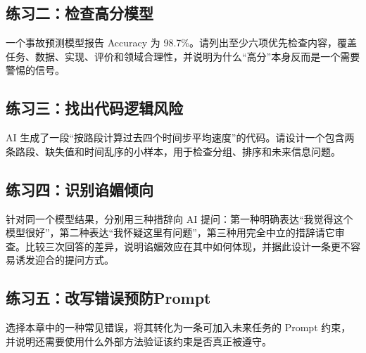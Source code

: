 \subsection*{练习二：检查高分模型}

一个事故预测模型报告 Accuracy 为 98.7\%。请列出至少六项优先检查内容，覆盖任务、数据、实现、评价和领域合理性，并说明为什么“高分”本身反而是一个需要警惕的信号。

\subsection*{练习三：找出代码逻辑风险}

AI 生成了一段“按路段计算过去四个时间步平均速度”的代码。请设计一个包含两条路段、缺失值和时间乱序的小样本，用于检查分组、排序和未来信息问题。

\subsection*{练习四：识别谄媚倾向}

针对同一个模型结果，分别用三种措辞向 AI 提问：第一种明确表达“我觉得这个模型很好”，第二种表达“我怀疑这里有问题”，第三种用完全中立的措辞请它审查。比较三次回答的差异，说明谄媚效应在其中如何体现，并据此设计一条更不容易诱发迎合的提问方式。

\subsection*{练习五：改写错误预防Prompt}

选择本章中的一种常见错误，将其转化为一条可加入未来任务的 Prompt 约束，并说明还需要使用什么外部方法验证该约束是否真正被遵守。
